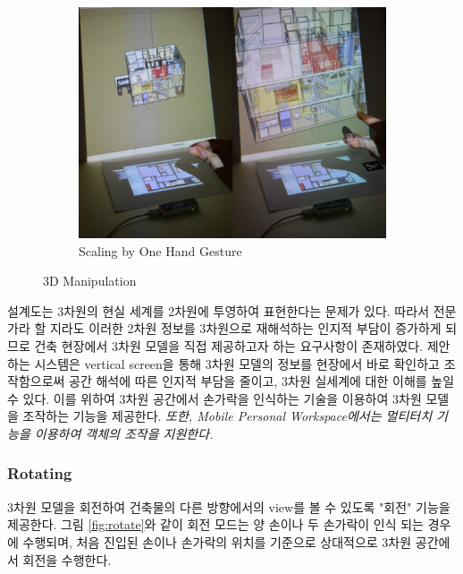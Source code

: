 \begin{figure}[!ht]
        \hfill
        \begin{subfigure}[b]{0.32\textwidth}
            \centering
            \includegraphics[width=\textwidth]{4-Interaction_Design/3d_scale_one_hand}
                \caption{Scaling by One Hand Gesture}
                \label{fig:scale_pinch}
        \end{subfigure}
	\caption{3D Manipulation}
    \label{fig:3d_mani}
\end{figure}


설계도는 3차원의 현실 세계를 2차원에 투영하여 표현한다는 문제가 있다. 따라서 전문가라 할 지라도 이러한 2차원 정보를 3차원으로 재해석하는 인지적 부담이 증가하게 되므로 건축 현장에서 3차원 모델을 직접 제공하고자 하는 요구사항이 존재하였다. 제안하는 시스템은 vertical screen을 통해 3차원 모델의 정보를 현장에서 바로 확인하고 조작함으로써 공간 해석에 따른 인지적 부담을 줄이고, 3차원 실세계에 대한 이해를 높일 수 있다. 이를 위하여 3차원 공간에서 손가락을 인식하는 기술을 이용하여 3차원 모델을 조작하는 기능을 제공한다. \textit{또한, Mobile Personal Workspace에서는 멀티터치 기능을 이용하여 객체의 조작을 지원한다.}

\subsubsection{Rotating}
3차원 모델을 회전하여 건축물의 다른 방향에서의 view를 볼 수 있도록 "회전" 기능을 제공한다. 그림 \ref{fig:rotate}와 같이 회전 모드는 양 손이나 두 손가락이 인식 되는 경우에 수행되며, 처음 진입된 손이나 손가락의 위치를 기준으로 상대적으로 3차원 공간에서 회전을 수행한다.

